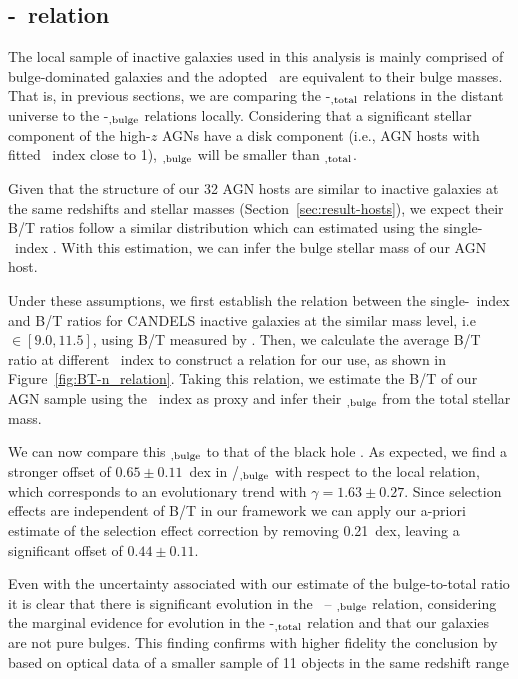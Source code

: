 \documentclass[apj]{emulateapj}
\begin{document}
\subsection{\mbh-\bmass\ relation}\label{sec:bh_bulge}

The local sample of inactive galaxies used in this analysis is mainly comprised of bulge-dominated galaxies and the adopted \smass\ are equivalent to their bulge masses. That is, in previous sections, we are comparing the \mbh-\smass$_{\rm ,total}$ relations in the distant universe to the \mbh-\smass$_{\rm ,bulge}$ relations locally. Considering that a significant stellar component of the high-$z$ AGNs have a disk component (i.e., AGN hosts with fitted \sersic\ index close to 1),  \smass$_{\rm , bulge}$ will be smaller than \smass$_{\rm ,total}$.

Given that the structure of our 32 AGN hosts are similar to inactive
galaxies at the same redshifts and stellar masses
(Section~\ref{sec:result-hosts}), we expect their B/T ratios follow
a similar distribution which can estimated using the single-\sersic\
index \citep{Bruce2014}. With this estimation, we can infer the
bulge stellar mass of our AGN host.

Under these assumptions, we first establish the relation between the
single-\sersic\ index and B/T ratios for CANDELS inactive galaxies
at the similar mass level, i.e \smass$\in [9.0, 11.5]$, using B/T
measured by \citet{Dimauro2018}. Then, we calculate the average B/T
ratio at different \sersic\ index to construct a relation for our
use, as shown in Figure~\ref{fig:BT-n_relation}. Taking this
relation, we estimate the B/T of our AGN sample using the \sersic\
index as proxy and infer their \smass$_{\rm, bulge}$ from the total
stellar mass. 

We can now compare this \smass$_{\rm, bulge}$ to that
of the black hole \mbh. As expected, we find a stronger offset of
$0.65\pm0.11$~dex in \mbh/\smass$_{\rm, bulge}$ with respect to the
local relation, which corresponds to an evolutionary trend with
$\gamma = 1.63\pm0.27$. Since selection effects are independent of B/T in
our framework we can apply our a-priori estimate of the selection
effect correction by removing 0.21~dex, leaving a significant offset
of $0.44\pm0.11$.

Even with the uncertainty associated with our estimate of the
bulge-to-total ratio it is clear that there is significant evolution
in the \mbh\ -- \smass$_{\rm , bulge}$ relation, considering the
marginal evidence for evolution in the \mbh-\smass$_{\rm, total}$
relation and that our galaxies are not pure bulges. This finding
confirms with higher fidelity the conclusion by \citet{Bennert11}
based on optical data of a smaller sample of 11 objects in the same
redshift range \citep[see][for similar results.]{SS13, Jah++09, Cisternas2011} 
\end{document}
